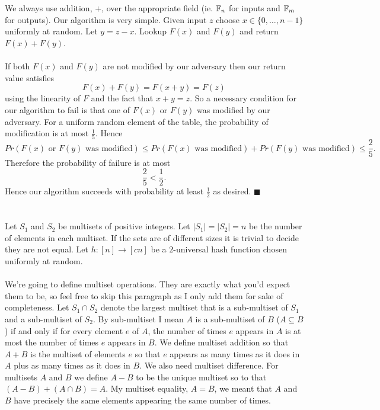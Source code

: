 \documentclass[letterpaper,12pt,oneside,onecolumn]{article}
\begin{document}
\section{}
\paragraph{}
We always use addition, $+$, over the appropriate field (ie. $\mathbb{F}_n$ for inputs and $\mathbb{F}_m$ for outputs). Our algorithm is very simple. Given input $z$ choose $x \in \{0,\dots, n-1\}$ uniformly at random. Let $y = z-x$. Lookup $F(x)$ and $F(y)$ and return $F(x) + F(y)$.
\paragraph{}
If both $F(x)$ and $F(y)$ are not modified by our adversary then our return value satisfies
$$F(x) + F(y) = F(x+y) = F(z)$$
using the linearity of $F$ and the fact that $x+y = z$. So a necessary condition for our algorithm to fail is that one of $F(x)$ or $F(y)$ was modified by our adversary. For a uniform random element of the table, the probability of modification is at most $\frac{1}{5}$. Hence
$$Pr(F(x)\text{ or } F(y)\text{ was modified}) \leq Pr(F(x) \text{ was modified}) + Pr(F(y)\text{ was modified}) \leq \frac{2}{5}.$$
Therefore the probability of failure is at most
$$\frac{2}{5} < \frac{1}{2}.$$
Hence our algorithm succeeds with probability at least $\frac{1}{2}$ as desired. $\blacksquare$

\newpage
\section{}
\paragraph{}
Let $S_1$ and $S_2$ be multisets of positive integers. Let $|S_1| = |S_2| = n$ be the number of elements in each multiset. If the sets are of different sizes it is trivial to decide they are not equal. Let $h:[n] \rightarrow [cn]$ be a $2$-universal hash function chosen uniformly at random.
\paragraph{}
We're going to define multiset operations. They are exactly what you'd expect them to be, so feel free to skip this paragraph as I only add them for sake of completeness. Let $S_1\cap S_2$ denote the largest multiset that is a sub-multiset of $S_1$ and a sub-multiset of $S_2$. By sub-multiset I mean $A$ is a sub-multiset of $B$ ($A\subseteq B$) if and only if for every element $e$ of $A$, the number of times $e$ appears in $A$ is at most the number of times $e$ appears in $B$. We define multiset addition so that $A+B$ is the multiset of elements $e$ so that $e$ appears as many times as it does in $A$ plus as many times as it does in $B$. We also need multiset difference. For multisets $A$ and $B$ we define $A-B$ to be the unique multiset so to that $(A-B) + (A\cap B) = A$. My multiset equality, $A=B$, we meant that $A$ and $B$ have precisely the same elements appearing the same number of times.
\end{document}
